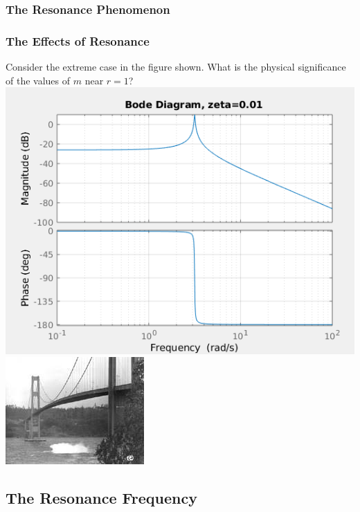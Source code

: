 \documentclass[fleqn]{beamer} %
\newcommand{\sectionIVsubsectionIItitle}{The Resonance Phenomenon}
\newcommand{\sectionIVsubsectionIIItitle}{The Resonance Frequency}
\begin{document}
			\begin{frame}
				\frametitle{\sectionIVsubsectionIItitle}
				\bigskip

				\frametitle{The Effects of Resonance}

				\small

				Consider the extreme case in the figure shown. What is the physical significance of the values of $m$ near $r=1$?  \vspc
				\includegraphics[scale=.25]{images/lecture4_fig3.png}\hspace{10mm} \includegraphics[scale=.6]{images/galloping_gertie_02.jpg}  \vspc

				\btVFill
			\end{frame}

		\subsection{\sectionIVsubsectionIIItitle}\label{sectionIVsubsectionIV}
\end{document}
